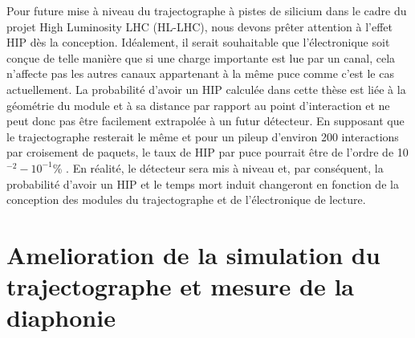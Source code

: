 
Pour future mise à niveau du trajectographe à pistes de silicium dans le cadre du projet High Luminosity LHC (HL-LHC), nous devons prêter attention à l’effet HIP dès la conception. Idéalement, il serait souhaitable que l’électronique soit conçue de telle manière que si une charge importante est lue par un canal, cela n’affecte pas les autres canaux appartenant à la même puce comme c’est le cas actuellement. La probabilité d'avoir un HIP calculée dans cette thèse est liée à la géométrie du module et à sa distance par rapport au point d'interaction et ne peut donc pas être facilement extrapolée à  un futur détecteur. En supposant que le trajectographe resterait le même et pour un pileup d'environ 200 interactions par croisement de paquets, le taux de HIP par puce pourrait être de l'ordre de 10$^{-2}-10 ^{-1}$\% . En réalité, le détecteur sera mis à niveau et, par conséquent, la probabilité d'avoir un HIP et le temps mort induit changeront en fonction de la conception des modules du trajectographe et de l’électronique de lecture.

\section{Amelioration de la simulation du trajectographe et mesure de la diaphonie}



